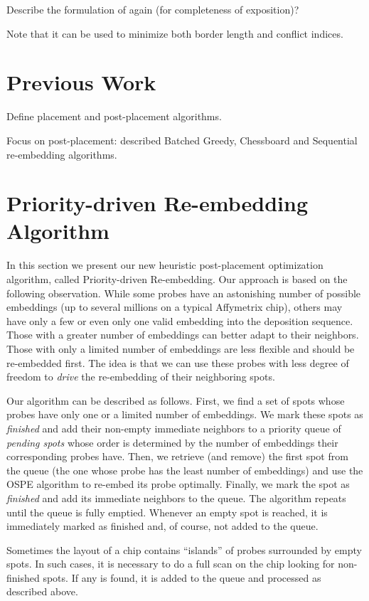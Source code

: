 \documentclass{llncs}
\begin{document}
Describe the formulation of \cite{KAHNG03} again (for completeness of exposition)?

Note that it can be used to minimize both border length and conflict indices.

\section{Previous Work}

Define placement and post-placement algorithms.

Focus on post-placement: described Batched Greedy, Chessboard and Sequential re-embedding algorithms.

\section{Priority-driven Re-embedding Algorithm}

In this section we present our new heuristic post-placement optimization algorithm, called Priority-driven Re-embedding. Our approach is based on the following observation. While some probes have an astonishing number of possible embeddings (up to several millions on a typical Affymetrix chip), others may have only a few or even only one valid embedding into the deposition sequence. Those with a greater number of embeddings can better adapt to their neighbors. Those with only a limited number of embeddings are less flexible and should be re-embedded first. The idea is that we can use these probes with less degree of freedom to \emph{drive} the re-embedding of their neighboring spots.

Our algorithm can be described as follows. First, we find a set of spots whose probes have only one or a limited number of embeddings. We mark these spots as \emph{finished} and add their non-empty immediate neighbors to a priority queue of \emph{pending spots} whose order is determined by the number of embeddings their corresponding probes have. Then, we retrieve (and remove) the first spot from the queue (the one whose probe has the least number of embeddings) and use the OSPE algorithm to re-embed its probe optimally. Finally, we mark the spot as \emph{finished} and add its immediate neighbors to the queue. The algorithm repeats until the queue is fully emptied. Whenever an empty spot is reached, it is immediately marked as finished and, of course, not added to the queue.

Sometimes the layout of a chip contains ``islands'' of probes surrounded by empty spots. In such cases, it is necessary to do a full scan on the chip looking for non-finished spots. If any is found, it is added to the queue and processed as described above.
\end{document}
